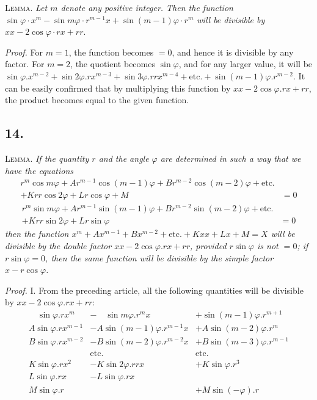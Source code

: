 \documentclass[12pt]{memoir}
\theoremstyle{plain}
\theoremstyle{remark}
\begin{document}
\textsc{Lemma.} \textit{Let \(m\) denote any positive integer. Then the function \(\sin \varphi \cdot x^m - \sin m \varphi \cdot r^{m-1} x + \sin(m-1)\varphi \cdot r^m\) will be divisible by \(xx - 2 \cos \varphi \cdot rx + rr\)}.

\textit{Proof.} For \(m = 1\), the function becomes \(= 0\), and hence it is divisible by any factor. For \(m=2\), the quotient becomes \(\sin \varphi\), and for any larger value, it will be \( \sin \varphi.x^{m-2} + \sin 2\varphi . rx^{m-3} + \sin 3\varphi . rrx^{m-4} + \text{etc.}+\sin(m-1)\varphi . r^{m-2} \). It can be easily confirmed that by multiplying this function by \(xx-2\cos\varphi . rx + rr\), the product becomes equal to the given function.

\subsection*{14.}

\textsc{Lemma.} \textit{If the quantity \(r\) and the angle \(\varphi\) are determined in such a way that we have the equations
\begin{align*} r^m \cos m \varphi + A r^{m-1} \cos(m-1) \varphi + B r^{m-2}\cos(m-2) \varphi + \text{etc.} &\\
+ Krr \cos 2\varphi + Lr \cos \varphi + M &= 0  \tag*{[1]} \end{align*}
\begin{align*} r^m \sin m \varphi + A r^{m-1} \sin(m-1) \varphi + B r^{m-2}\sin(m-2) \varphi + \text{etc.}& \\
+ Krr \sin 2\varphi + Lr \sin \varphi & = 0  \tag*{[2]}\end{align*}
then the function \(x^m+Ax^{m-1} + Bx^{m-2}+\text{etc.}+Kxx + Lx + M = X\) will be divisible by the double factor \(xx-2\cos\varphi.rx+rr\), provided \(r\sin\varphi\) is not \(=0\); if \(r\sin\varphi = 0\), then the same function will be divisible by the simple factor \(x - r \cos\varphi\).}

\textit{Proof.} I. From the preceding article, all the following quantities will be divisible by \(xx - 2\cos \varphi . rx + rr\): \[\begin{array}{lll} \hspace{1em} \sin \varphi. rx^m &-\hspace{1em} \sin m \varphi . r^m x &+ \sin (m-1) \varphi . r^{m+1} \\ A\sin \varphi. rx^{m-1} &- A\sin (m-1) \varphi . r^{m-1} x &+ A\sin (m-2) \varphi . r^{m} \\ B\sin \varphi. rx^{m-2} &- B \sin (m-2) \varphi . r^{m-2} x &+ B\sin (m-3) \varphi . r^{m-1} \\ &\text{etc.} & \text{etc.} \\ K\sin \varphi. rx^2 &- K\sin 2 \varphi . rr x &+K\sin \varphi . r^{3} \\ L\sin \varphi. rx &- L \sin  \varphi . r x &  \\ M\sin \varphi. r &  &+ M\sin(-\varphi).r \end{array}\]
\end{document}
